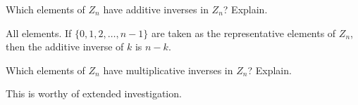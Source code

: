\documentclass{ximera}
\begin{document}
\begin{question}
Which elements of $Z_n$ have additive inverses in $Z_n$?  Explain.  
\begin{freeResponse}
All elements.  If $\{0, 1, 2, \dots, n-1\}$ are taken as the representative elements of $Z_n$, then the additive inverse of $k$ is $n-k$.  
\end{freeResponse}
\end{question}

\begin{question}
Which elements of $Z_n$ have multiplicative inverses in $Z_n$?  Explain. 
\begin{freeResponse}
This is worthy of extended investigation.  
\end{freeResponse}
\end{question}
\end{document}
